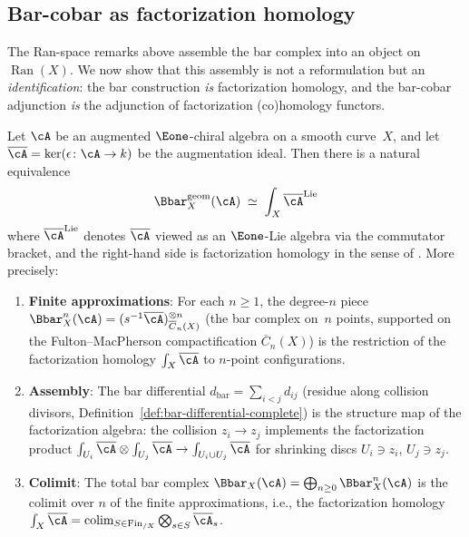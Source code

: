 \subsection{Bar-cobar as factorization homology}
\label{subsec:bar-cobar-fh}

The Ran-space remarks above assemble the bar complex into an
object on $\operatorname{Ran}(X)$.  We now show that this
assembly is not a reformulation but an \emph{identification}:
the bar construction \emph{is} factorization homology, and the
bar-cobar adjunction \emph{is} the adjunction of factorization
(co)homology functors.

\begin{proposition}
\label{prop:bar-fh}
Let $\cA$ be an augmented $\Eone$-chiral algebra on a smooth
curve~$X$, and let $\overline{\cA} = \ker(\epsilon \colon \cA \to k)$
be the augmentation ideal.  Then there is a natural equivalence
\[
\Bbar^{\mathrm{geom}}_X(\cA)
\;\simeq\;
\int_X \overline{\cA}^{\mathrm{Lie}}
\]
where $\overline{\cA}^{\mathrm{Lie}}$ denotes $\overline{\cA}$ viewed as
an $\Eone$-Lie algebra via the commutator bracket, and the right-hand
side is factorization homology in the sense of
\textup{\cite{AF15, BD04}}.  More precisely:
\begin{enumerate}[label=(\roman*)]
\item \textbf{Finite approximations}: For each $n \geq 1$,
the degree-$n$ piece $\Bbar^n_X(\cA) =
(s^{-1}\overline{\cA})^{\otimes n}_{\overline{C}_n(X)}$
(the bar complex on~$n$ points, supported on the
Fulton--MacPherson compactification $\overline{C}_n(X)$) is the
restriction of the factorization homology $\int_X\overline{\cA}$
to $n$-point configurations.
\item \textbf{Assembly}: The bar differential
$d_{\mathrm{bar}} = \sum_{i < j} d_{ij}$ (residue along collision
divisors, Definition~\ref{def:bar-differential-complete}) is the
structure map of the factorization algebra:
the collision $z_i \to z_j$ implements the factorization product
$\int_{U_i}\overline{\cA} \otimes
\int_{U_j}\overline{\cA} \to
\int_{U_i \cup U_j}\overline{\cA}$
for shrinking discs $U_i \ni z_i$, $U_j \ni z_j$.
\item \textbf{Colimit}: The total bar complex
$\Bbar_X(\cA) = \bigoplus_{n \geq 0}\Bbar^n_X(\cA)$
is the colimit over $n$ of the finite approximations,
i.e., the factorization homology
$\int_X\overline{\cA} = \operatorname{colim}_{S \in
\mathrm{Fin}_{/X}} \bigotimes_{s \in S}\overline{\cA}_s$.
\end{enumerate}
\end{proposition}

